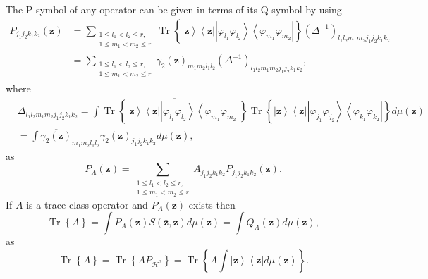 \documentclass[aps,preprint]{revtex4}%
\begin{document}
The P-symbol of any operator can be given in terms of its Q-symbol by using
\begin{align}
P_{j_{1}j_{2}k_{1}k_{2}}\left(  \mathbf{z}\right)   &  =\sum_{\substack{1\leq
l_{1}<l_{2}\leq r,\\1\leq m_{1}<m_{2}\leq r}}\operatorname*{Tr}\left\{
\left\vert \mathbf{z}\right\rangle \left\langle \mathbf{z}\right\vert
\left\vert \varphi_{l_{1}}\varphi_{l_{2}}\right\rangle \left\langle
\varphi_{m_{1}}\varphi_{m_{2}}\right\vert \right\}  \left(  \Delta
^{-1}\right)  _{l_{1}l_{2}m_{1}m_{2}j_{1}j_{2}k_{1}k_{2}}\nonumber\\
&  =\sum_{\substack{1\leq l_{1}<l_{2}\leq r,\\1\leq m_{1}<m_{2}\leq r}%
}\gamma_{2}\left(  \mathbf{z}\right)  _{m_{1}m_{2}l_{1}l_{2}}\left(
\Delta^{-1}\right)  _{l_{1}l_{2}m_{1}m_{2}j_{1}j_{2}k_{1}k_{2}},
\end{align}
where%
\begin{align}
&  \Delta_{l_{1}l_{2}m_{1}m_{2}j_{1}j_{2}k_{1}k_{2}}=\int\overline
{\operatorname*{Tr}\left\{  \left\vert \mathbf{z}\right\rangle \left\langle
\mathbf{z}\right\vert \left\vert \varphi_{l_{1}}\varphi_{l_{2}}\right\rangle
\left\langle \varphi_{m_{1}}\varphi_{m_{2}}\right\vert \right\}
}\operatorname*{Tr}\left\{  \left\vert \mathbf{z}\right\rangle \left\langle
\mathbf{z}\right\vert \left\vert \varphi_{j_{1}}\varphi_{j_{2}}\right\rangle
\left\langle \varphi_{k_{1}}\varphi_{k_{2}}\right\vert \right\}  d\mu\left(
\mathbf{z}\right) \nonumber\\
&  =\int\overline{\gamma_{2}\left(  \mathbf{z}\right)  }_{m_{1}m_{2}l_{1}%
l_{2}}\gamma_{2}\left(  \mathbf{z}\right)  _{j_{1}j_{2}k_{1}k_{2}}d\mu\left(
\mathbf{z}\right)  ,
\end{align}
as
\begin{equation}
P_{A}\left(  \mathbf{z}\right)  =\sum_{\substack{1\leq l_{1}<l_{2}\leq
r,\\1\leq m_{1}<m_{2}\leq r}}A_{j_{1}j_{2}k_{1}k_{2}}P_{j_{1}j_{2}k_{1}k_{2}%
}\left(  \mathbf{z}\right)  .
\end{equation}
If $A$ is a trace class operator and $P_{A}\left(  \mathbf{z}\right)  $ exists
then
\begin{equation}
\operatorname*{Tr}\left\{  A\right\}  =\int P_{A}\left(  \mathbf{z}\right)
S\left(  \mathbf{\bar{z},z}\right)  d\mu\left(  \mathbf{z}\right)  =\int
Q_{A}\left(  \mathbf{z}\right)  d\mu\left(  \mathbf{z}\right)  ,
\end{equation}
as
\begin{equation}
\operatorname*{Tr}\left\{  A\right\}  =\operatorname*{Tr}\left\{
AP_{\mathcal{H}^{2}}\right\}  =\operatorname*{Tr}\left\{  A\int\left\vert
\mathbf{z}\right\rangle \left\langle \mathbf{z}\right\vert d\mu\left(
\mathbf{z}\right)  \right\}  .
\end{equation}
\end{document}
